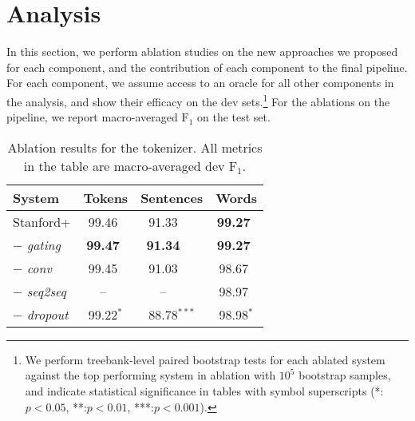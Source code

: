 \documentclass[11pt,a4paper]{article}
\newcommand{\fone}{$\text{F}_1$}
\begin{document}
 
\section{Analysis}

In this section, we perform ablation studies on the new approaches we proposed for each component, and the contribution of each component to the final pipeline.
For each component, we assume access to an oracle for all other components in the analysis, and show their efficacy on the dev sets.\footnote{We perform treebank-level paired bootstrap tests for each ablated system against the top performing system in ablation with $10^5$ bootstrap samples, and indicate statistical significance in tables with symbol superscripts (*:$p < 0.05$, **:$p<0.01$, ***:$p < 0.001$).}
For the ablations on the pipeline, we report macro-averaged \fone{} on the test set.

\begin{table}
\centering
\small
\begin{tabular}{lccc}
\toprule
System & Tokens & Sentences & Words \\
\midrule
Stanford+ & 99.46$^{\phantom{*}}$ & 91.33$^{\phantom{***}}$ & \textbf{99.27}$^{\phantom{*}}$ \\
$-$ \textit{gating} & \textbf{99.47}$^{\phantom{*}}$ & \textbf{91.34}$^{\phantom{***}}$ & \textbf{99.27}$^{\phantom{*}}$\\
$-$ \textit{conv} & 99.45$^{\phantom{*}}$ & 91.03$^{\phantom{***}}$ & 98.67$^{\phantom{*}}$\\
$-$ \textit{seq2seq} & --$^{\phantom{*}}$ & --$^{\phantom{***}}$ & 98.97$^{\phantom{*}}$\\
$-$ \textit{dropout} & 99.22$^{*}$ & 88.78$^{***}$ & 98.98$^{*}$\\
\bottomrule
\end{tabular}
\caption{Ablation results for the tokenizer. All metrics in the table are macro-averaged dev \fone{}.} \label{tab:tok_ablation}
\end{table}
\end{document}
